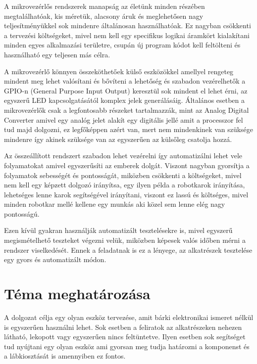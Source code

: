 
A mikrovezérlős rendszerek manapság az életünk minden részében megtalálhatóak, kis méretük, 
alacsony áruk és meglehetősen nagy teljesítményükkel sok mindenre általánosan használhatóak. 
Ez nagyban csökkenti a tervezési költségeket, mivel nem kell egy specifikus logikai áramkört 
kialakítani minden egyes alkalmazási területre, csupán új program kódot kell feltölteni és 
használható egy teljesen más célra.

A mikrovezérlő könnyen összeköthetőek külső eszközökkel amellyel rengeteg mindent meg lehet 
valósítani és bővíteni a lehetőség és szabadon vezérelhetők a GPIO-n (General Purpose Input 
Output) keresztül sok mindent el lehet érni, az egyszerű LED kapcsolgatásától komplex jelek 
generálásáig. Általános esetben a mikrovezérlők csak a legfontosabb részeket tartalmazzák, 
mint az Analog Digital Converter amivel egy analóg jelet alakít egy digitális jellé amit a 
processzor fel tud majd dolgozni, ez legfőképpen azért van, mert nem mindenkinek van szüksége 
mindenre így akinek szüksége van az egyszerűen az külsőleg csatolja hozzá. 

Az összeállított rendszert szabadon lehet vezérelni így automatizálni lehet vele folyamatokat 
amivel egyszerűsíti az emberek dolgát. Viszont nagyban gyorsítja a folyamatok sebességét és 
pontosságát, miközben csökkenti a költségeket, mivel nem kell egy képzett dolgozó irányítsa, 
egy ilyen példa a robotkarok irányítása, lehetséges lenne karok segítségével irányítani, 
viszont ez lassú és költséges, mivel minden robotkar mellé kellene egy munkás aki közel sem 
lenne elég nagy pontosságú. 

Ezen kívül gyakran használják automatizált tesztelésekre is, mivel egyszerű megismételhető 
teszteket végezni velük, miközben képesek valós időben mérni a rendszer viselkedését. Ennek 
a feladatnak is ez a lényege, az alkatrészek tesztelése egy gyors és automatizált módon. 


\section{Téma meghatározása}

A dolgozat célja egy olyan eszköz tervezése, amit bárki elektronikai ismeret nélkül is egyszerűen 
használni lehet. Sok esetben a feliratok az alkatrészeken nehezen látható, lekopott vagy 
egyszerűen nincs feltüntetve. Ilyen esetben sok segítséget tud nyújtani egy olyan eszköz ami 
gyorsan meg tudja határozni a komponenst és a lábkiosztását is amennyiben ez fontos.

